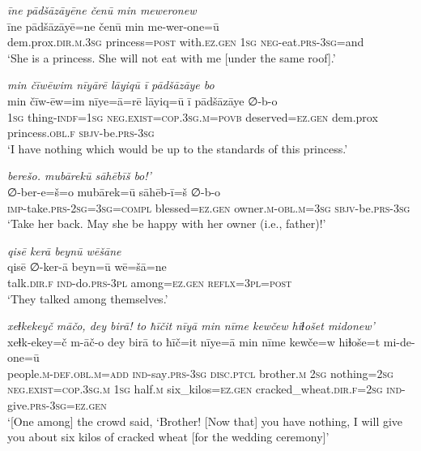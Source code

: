 \ea \label{ZP.104}
\textit{īne pādšāzāyēne čenū min meweronew} \\ 
\gll īne pādšāzāyē=ne čenū min me-wer-one=ū \\ 
 dem.prox\textsc{.dir}\textsc{.m}\textsc{.3sg} princess\textsc{=\textsc{post}} with\textsc{.ez.gen} \textsc{1sg} \textsc{neg-}eat\textsc{.prs}\textsc{-3sg}=and \\ 
\glt `She is a princess. She will not eat with me [under the same roof].'
\z 
 
\ea \label{ZP.105}
\textit{min čīwēwim nīyārē lāyiqū ī pādšāzāye bo} \\ 
\gll min čīw-ēw=im nīye=ā=rē lāyiq=ū ī pādšāzāye ∅-b-o \\ 
 \textsc{1sg} thing\textsc{-indf}\textsc{=\textsc{1sg}} \textsc{\textsc{neg.}exist}\textsc{=cop}\textsc{.3sg}\textsc{.m}\textsc{=\textsc{povb}} deserved\textsc{\textsc{=ez.gen}} dem.prox princess\textsc{.obl}\textsc{.f} \textsc{sbjv-}be\textsc{.prs}\textsc{-3sg} \\ 
\glt `I have nothing which would be up to the standards of this princess.'
\z 
 
\ea \label{ZP.106}
\textit{berešo. mubārekū sāhēbīš bo!’} \\ 
\gll ∅-ber-e=š=o mubārek=ū sāhēb-ī=š ∅-b-o \\ 
 \textsc{imp-}take\textsc{.prs}-\textsc{2sg}\textsc{=3sg}\textsc{=compl} blessed\textsc{\textsc{=ez.gen}} owner\textsc{.m}\textsc{-obl}\textsc{.m}\textsc{=3sg} \textsc{sbjv-}be\textsc{.prs}\textsc{-3sg} \\ 
\glt `Take her back. May she be happy with her owner (i.e., father)!'
\z 
 
\ea \label{ZP.114}
\textit{qisē kerā beynū wēšāne} \\ 
\gll qisē ∅-ker-ā beyn=ū wē=šā=ne \\ 
 talk\textsc{.dir}\textsc{.f} \textsc{ind-}do\textsc{.prs}\textsc{-3pl} among\textsc{\textsc{=ez.gen}} \textsc{reflx}\textsc{=3pl}\textsc{=\textsc{post}} \\ 
\glt `They talked among themselves.'
\z 
 
\ea \label{ZP.118}
\textit{xeɫkekeyč māčo, dey birā! to ħīčit nīyā min nīme kewčew hiɫošet midonew’} \\ 
\gll xeɫk-ekey=č m-āč-o dey birā to ħīč=it nīye=ā min nīme kewče=w hiɫoše=t mi-de-one=ū \\ 
 people\textsc{.m}\textsc{-def}\textsc{.obl}\textsc{.m}\textsc{=add} \textsc{ind-}say\textsc{.prs}\textsc{-3sg} \textsc{disc.ptcl} brother\textsc{.m} \textsc{2sg} nothing\textsc{=\textsc{2sg}} \textsc{\textsc{neg.}exist}\textsc{=cop}\textsc{.3sg}\textsc{.m} \textsc{1sg} half\textsc{.m} six\_kilos\textsc{\textsc{=ez.gen}} cracked\_wheat\textsc{.dir}\textsc{.f}\textsc{=\textsc{2sg}} \textsc{ind-}give\textsc{.prs}\textsc{-3sg}\textsc{\textsc{=ez.gen}} \\ 
\glt `[One among] the crowd said, ‘Brother! [Now that] you have nothing, I will give you about six kilos of cracked wheat [for the wedding ceremony]'
\z 
 
